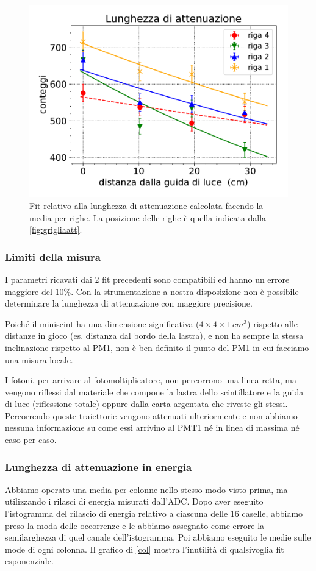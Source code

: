 \begin{figure}[h]
\centering
\includegraphics[width=8 cm]{4atte}
\caption{Fit relativo alla lunghezza di attenuazione calcolata facendo la media per righe. La posizione delle righe è quella indicata dalla \autoref{fig:grigliaatt}.}
\label{4atte}
\end{figure}


\subsubsection{Limiti della misura}

I parametri ricavati dai 2 fit precedenti sono compatibili ed hanno un errore maggiore del 10\%.
Con la strumentazione a nostra disposizione non è possibile determinare
la lunghezza di attenuazione con maggiore precisione.

Poiché il miniscint ha una dimensione significativa ($4\times4\times1\,\si{cm^3}$)
rispetto alle distanze in gioco (es. distanza dal bordo della lastra),
e non ha sempre la stessa inclinazione rispetto al PM1,
non è ben definito il punto del PM1 in cui facciamo una misura locale.

I fotoni, per arrivare al fotomoltiplicatore, non percorrono una linea retta,
ma vengono riflessi dal materiale che compone la lastra dello scintillatore e la guida di luce (riflessione totale)
oppure dalla carta argentata che riveste gli stessi.
Percorrendo queste traiettorie vengono attenuati ulteriormente e non abbiamo nessuna informazione
su come essi arrivino al PMT1 né in linea di massima né caso per caso.

\subsubsection{Lunghezza di attenuazione in energia}

Abbiamo operato una media per colonne nello stesso modo visto prima, ma utilizzando i rilasci di energia misurati dall'ADC.
Dopo aver eseguito l'istogramma del rilascio di energia relativo a ciascuna delle 16 caselle,
abbiamo preso la moda delle occorrenze
e le abbiamo assegnato come errore la semilarghezza di quel canale dell'istogramma.
Poi abbiamo eseguito le medie sulle mode di ogni colonna.
Il grafico di \autoref{col} mostra l'inutilità di qualsivoglia fit esponenziale.

